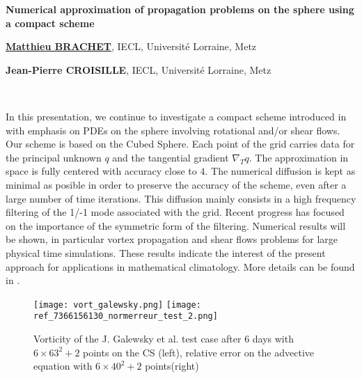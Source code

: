 \documentclass[10pt]{article}
\def\titre#1{\begin{center}{\Large{\bf #1}}\end{center}}
\def\orateur#1#2{\begin{center}{\underline{\large{\bf #1}}}, {#2}\end{center}}
\def\auteur#1#2{\begin{center}{\large{\bf #1}}, {#2}\end{center}}
\def\motscles#1{%
	\ifx#1\IsUndefined\relax\else\noindent{\normalsize{\bf Mots-cl\'es :}} #1\\ \fi}
\begin{document}
\thispagestyle{empty}

\def\Titre{Numerical approximation of propagation problems on the sphere using a compact scheme}
\def\NomOrateur{Matthieu BRACHET}
\def\AdresseCourteOrateur{IECL, Universit\'e Lorraine, Metz}
\def\AdresseLongueOrateur{Institut Elie Cartan de Lorraine, UMR 7502, Univ. Lorraine, Metz}
\def\EmailOrateur{email}

\def\NomAuteurI{Jean-Pierre CROISILLE}
\def\AdresseCourteAuteurI{IECL, Universit\'e Lorraine, Metz}
\def\AdresseLongueAuteurI{Institut Elie Cartan de Lorraine, UMR 7502, Univ. Lorraine, Metz}
\def\EmailAuteurI{jean-pierre.croisille@univ-lorraine.fr}

\titre{\Titre}%

\orateur{\NomOrateur}{\AdresseCourteOrateur}
\auteur{\NomAuteurI}{\AdresseCourteAuteurI}

\motscles{\listmotcles}

In this presentation, we continue to investigate a compact scheme
introduced in \cite{Croisille2013, Croisille2015} with emphasis on PDEs on the sphere involving
rotational and/or shear flows.
Our scheme is based on the Cubed Sphere. Each point of the grid carries
data for the principal unknown $q$ and the tangential gradient $\nabla_T
q$. The approximation in space is fully centered with accuracy close to
$4$. The numerical diffusion is kept as minimal as posible in order to
preserve the accuracy of the scheme, even after a large number of time
iterations. This diffusion mainly consists in a high frequency filtering
of the 1/-1 mode associated with the grid.
Recent progress has focused on the importance of the symmetric form of
the filtering. Numerical results will be shown, in particular vortex propagation \cite{Nair2008} and shear flows problems
\cite{Galewsky2004} for large physical time simulations. These results
indicate the interest of the present approach for applications in
mathematical climatology.
More details can be found in \cite{Brachetyear}.

\begin{figure}[ht]
\begin{center}
\texttt{[image: vort\_galewsky.png]}
\texttt{[image: ref\_7366156130\_normerreur\_test\_2.png]}
\end{center}
\caption{Vorticity of the J. Galewsky et al. test case \cite{Galewsky2004} after 6 days with $6 \times 63^2 + 2$ points on the CS (left), relative error on the advective equation \cite{Nair2008} with $6 \times 40^2 + 2$ points(right)}
\end{figure}
\end{document}
